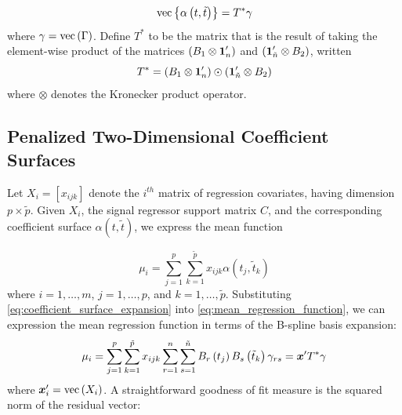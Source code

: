 \documentclass[12pt]{article}
\newcommand*\outlineskeleton{\color{green}}
\newcommand{\bfone}{\mbox{\boldmath $1$}}
\newcommand{\bfx}{\mbox{\boldmath $x$}}
\begin{document}
\begin{equation} \label{eq:coef_surface_vec_notation}
\textup{vec}\left\{\alpha\left(t, \tilde{t}\right)\right\} = T^*\gamma
\end{equation}
\noindent
 where $\gamma = \textup{vec}\left(\Gamma\right)$. Define $T^*$ to be the matrix that is the result of taking the element-wise product of the matrices $\left(B_1 \otimes \bfone_n^\prime \right)$ and $\left(\bfone_{\tilde{n}}^\prime \otimes B_2 \right)$, written
\begin{equation}
T^*  = \left(B_1 \otimes \bfone_n^\prime \right) \odot \left(\bfone_{\tilde{n}}^\prime \otimes B_2 \right)
\end{equation} 
 \noindent 
where $\otimes$ denotes the Kronecker product operator. 

\subsection{{\outlineskeleton Penalized Two-Dimensional Coefficient Surfaces}}

Let $X_i = \left[x_{ijk}\right]$ denote the $i^{th}$ matrix of regression covariates, having dimension $p \times \tilde{p}$. Given $X_i$, the signal regressor support matrix $C$, and the corresponding coefficient surface $\alpha\left(t,\tilde{t}\right)$, we express the mean function 

\begin{equation} \label{eq:mean_regression_function}
\mu_i = \sum_{j=1}^p \sum_{k=1}^{\tilde{p}} x_{ijk} \alpha\left(t_j,\tilde{t}_k\right)
\end{equation} 
\noindent
where $i=1, \dots, m$, $j=1, \dots, p$, and $k=1,\dots,\tilde{p}$. Substituting \ref{eq:coefficient_surface_expansion} into \ref{eq:mean_regression_function}, we can expression the mean regression function in terms of the B-spline basis expansion:
\begin{equation} \label{eq:mean_regression_function_vec_notation}
\mu_i = \sum_{j=1}^p \sum_{k=1}^{\tilde{p}} x_{ijk}  \sum_{r=1}^n \sum_{s=1}^{\tilde{n}}  B_r\left(t_{j}\right) B_s\left(\tilde{t}_{k}\right) \gamma_{rs} = \bfx^\prime T^* \gamma
\end{equation} 
\noindent  
where $\bfx_i^\prime = \textup{vec}\left(X_i\right)$. A straightforward goodness of fit measure is the squared norm of the residual vector:
\end{document}
